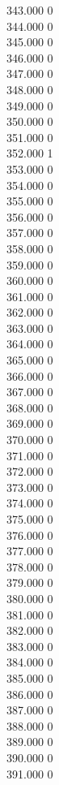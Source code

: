 { 343.000	0 \\
 344.000	0 \\
 345.000	0 \\
 346.000	0 \\
 347.000	0 \\
 348.000	0 \\
 349.000	0 \\
 350.000	0 \\
 351.000	0 \\
 352.000	1 \\
 353.000	0 \\
 354.000	0 \\
 355.000	0 \\
 356.000	0 \\
 357.000	0 \\
 358.000	0 \\
 359.000	0 \\
 360.000	0 \\
 361.000	0 \\
 362.000	0 \\
 363.000	0 \\
 364.000	0 \\
 365.000	0 \\
 366.000	0 \\
 367.000	0 \\
 368.000	0 \\
 369.000	0 \\
 370.000	0 \\
 371.000	0 \\
 372.000	0 \\
 373.000	0 \\
 374.000	0 \\
 375.000	0 \\
 376.000	0 \\
 377.000	0 \\
 378.000	0 \\
 379.000	0 \\
 380.000	0 \\
 381.000	0 \\
 382.000	0 \\
 383.000	0 \\
 384.000	0 \\
 385.000	0 \\
 386.000	0 \\
 387.000	0 \\
 388.000	0 \\
 389.000	0 \\
 390.000	0 \\
 391.000	0 \\
}
